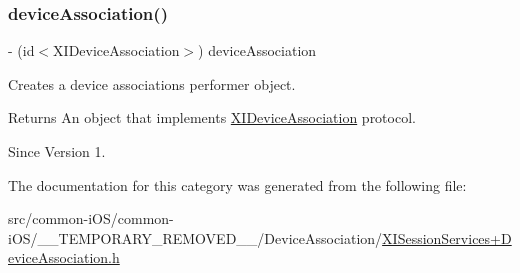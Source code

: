 \subsubsection{\texorpdfstring{device\+Association()}{deviceAssociation()}}
{\footnotesize\ttfamily -\/ (id$<$X\+I\+Device\+Association$>$) device\+Association \begin{DoxyParamCaption}{ }\end{DoxyParamCaption}}



Creates a device associations performer object. 

\begin{DoxyReturn}{Returns}
An object that implements \hyperlink{}{X\+I\+Device\+Association} protocol. 
\end{DoxyReturn}
\begin{DoxySince}{Since}
Version 1. 
\end{DoxySince}


The documentation for this category was generated from the following file\+:\begin{DoxyCompactItemize}
\item 
src/common-\/i\+O\+S/common-\/i\+O\+S/\+\_\+\+\_\+\+T\+E\+M\+P\+O\+R\+A\+R\+Y\+\_\+\+R\+E\+M\+O\+V\+E\+D\+\_\+\+\_\+/\+Device\+Association/\hyperlink{_x_i_session_services_09_device_association_8h}{X\+I\+Session\+Services+\+Device\+Association.\+h}\end{DoxyCompactItemize}

